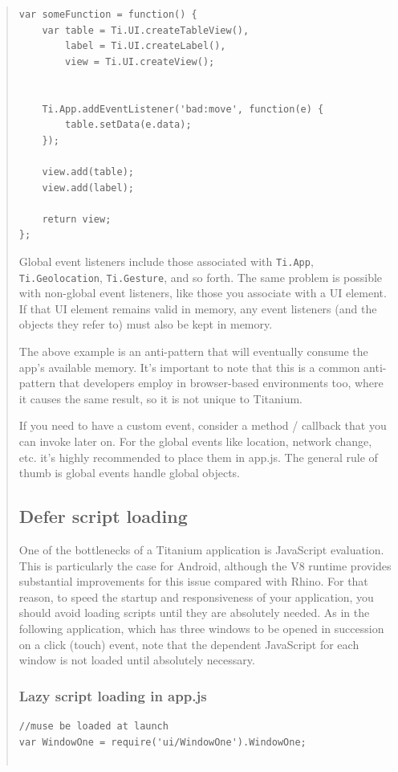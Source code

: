 \documentclass[11pt]{book}
\begin{document}
\begin{quotation}
\begin{lstlisting}[frame=single]
var someFunction = function() {
    var table = Ti.UI.createTableView(),
        label = Ti.UI.createLabel(),
        view = Ti.UI.createView();


    Ti.App.addEventListener('bad:move', function(e) {
        table.setData(e.data);
    });

    view.add(table);
    view.add(label);

    return view;
};
\end{lstlisting}

Global event listeners include those associated with \texttt{Ti.App}, \texttt{Ti.Geolocation}, \texttt{Ti.Gesture}, and so forth. The same problem is possible with non-global event listeners, like those you associate with a UI element. If that UI element remains valid in memory, any event listeners (and the objects they refer to) must also be kept in memory.

The above example is an anti-pattern that will eventually consume the app's available memory. It's important to note that this is a common anti-pattern that developers employ in browser-based environments too, where it causes the same result, so it is not unique to Titanium.

If you need to have a custom event, consider a method / callback that you can invoke later on. For the global events like location, network change, etc. it's highly recommended to place them in app.js. The general rule of thumb is global events handle global objects.

\subsection{Defer script loading}
One of the bottlenecks of a Titanium application is JavaScript evaluation. This is particularly the case for Android, although the V8 runtime provides substantial improvements for this issue compared with Rhino. For that reason, to speed the startup and responsiveness of your application, you should avoid loading scripts until they are absolutely needed. As in the following application, which has three windows to be opened in succession on a click (touch) event, note that the dependent JavaScript for each window is not loaded until absolutely necessary.

\subsubsection{Lazy script loading in app.js}
\begin{lstlisting}[frame=single]
//muse be loaded at launch
var WindowOne = require('ui/WindowOne').WindowOne;


\end{lstlisting}
\end{quotation}
\end{document}
